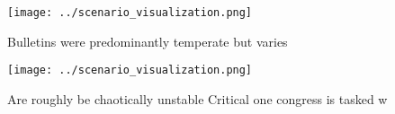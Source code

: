 \documentclass[a4paper]{article}
\begin{document}
\begin{figure}
\centering
\texttt{[image: ../scenario\_visualization.png]}
\caption{Bulletins were predominantly temperate but varies
}
\end{figure}
 
\begin{figure}
\centering
\texttt{[image: ../scenario\_visualization.png]}
\caption{Are roughly be chaotically unstable Critical one congress is tasked w
}
\end{figure}
 
\end{document}
